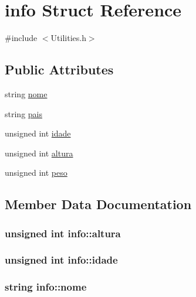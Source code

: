 \hypertarget{structinfo}{}\section{info Struct Reference}
\label{structinfo}


{\ttfamily \#include $<$Utilities.\+h$>$}

\subsection*{Public Attributes}
\begin{DoxyCompactItemize}
\item 
string \hyperlink{structinfo_a28dfd13a605b5ae85eb5a27115b67593}{nome}
\item 
string \hyperlink{structinfo_a37b5c5d6ed7ce6cec6ab195ae298be96}{pais}
\item 
unsigned int \hyperlink{structinfo_a442f4f1612150f9b4ad669ee54167afb}{idade}
\item 
unsigned int \hyperlink{structinfo_acdc83e8deaba2416ed6271dddc66c78b}{altura}
\item 
unsigned int \hyperlink{structinfo_aaf2f4c91fa728eba96d18912d3eca865}{peso}
\end{DoxyCompactItemize}


\subsection{Member Data Documentation}
\hypertarget{structinfo_acdc83e8deaba2416ed6271dddc66c78b}{}
\subsubsection[{altura}]{\setlength{\rightskip}{0pt plus 5cm}unsigned int info\+::altura}\label{structinfo_acdc83e8deaba2416ed6271dddc66c78b}
\hypertarget{structinfo_a442f4f1612150f9b4ad669ee54167afb}{}
\subsubsection[{idade}]{\setlength{\rightskip}{0pt plus 5cm}unsigned int info\+::idade}\label{structinfo_a442f4f1612150f9b4ad669ee54167afb}
\hypertarget{structinfo_a28dfd13a605b5ae85eb5a27115b67593}{}
\subsubsection[{nome}]{\setlength{\rightskip}{0pt plus 5cm}string info\+::nome}\label{structinfo_a28dfd13a605b5ae85eb5a27115b67593}
\hypertarget{structinfo_a37b5c5d6ed7ce6cec6ab195ae298be96}{}
